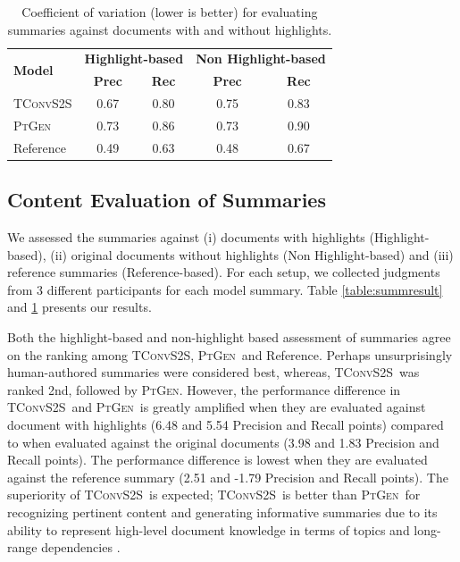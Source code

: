 \documentclass[11pt,a4paper]{article}
\newcommand\ptgen{\textsc{PtGen}}
\newcommand\tconv{\textsc{TConvS2S}}
\begin{document}
\begin{table}[t!]
\small
\begin{tabular}{l|cc|cc}
\hline
\multirow{2}{*}{\textbf{Model}} & 
\multicolumn{2}{c|}{\textbf{Highlight-based}} & 
\multicolumn{2}{c}{\textbf{Non Highlight-based}} \\
&\textbf{Prec} & \textbf{Rec} & 
 \textbf{Prec} & \textbf{Rec} \\ \hline
\tconv{} & 0.67 & 0.80 & 0.75                             & 0.83  \\
\ptgen{} & 0.73 & 0.86 & 0.73   & 0.90  \\
Reference                             & 0.49                           & 0.63 & 0.48   & 0.67 \\
\hline

\end{tabular}
\caption{Coefficient of variation (lower is better) for evaluating summaries against documents with and without highlights.}
\label{table:summresultcv}
\end{table}

\subsection{Content Evaluation of Summaries} 
\label{subsec:conteval}

We assessed the summaries against (i) documents with highlights (Highlight-based), (ii) original documents without highlights (Non Highlight-based) and (iii) reference summaries (Reference-based). For each setup, we collected judgments from 3 different participants for each model summary. Table \ref{table:summresult} and \ref{table:summresultcv} presents our results.

Both the highlight-based and non-highlight based assessment of summaries agree on the ranking among \tconv, \ptgen\ and Reference. Perhaps unsurprisingly human-authored summaries were considered best, whereas, \tconv\ was ranked 2nd, followed by \ptgen. However, the performance difference in \tconv\ and \ptgen\ is greatly amplified when they are evaluated against document with highlights (6.48 and 5.54 Precision and Recall points) compared to when evaluated against the original documents (3.98 and 1.83 Precision and Recall points). The performance difference is lowest when they are evaluated against the reference summary (2.51 and -1.79 Precision and Recall points). The superiority of \tconv\ is expected; \tconv\ is better than \ptgen\ for recognizing pertinent content and generating informative summaries due to its ability to represent high-level document knowledge in terms of topics and long-range dependencies \citep{narayan18xsum}.
\end{document}
